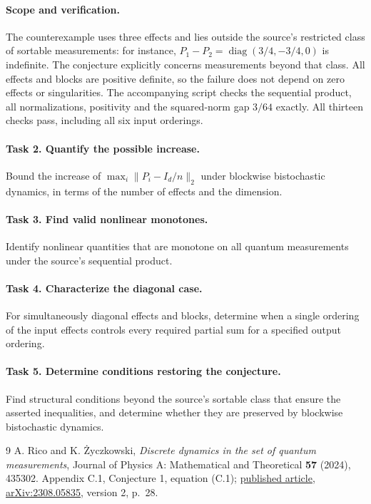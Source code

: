 \documentclass[11pt]{article}
\begin{document}
\paragraph{Scope and verification.}
The counterexample uses three effects and lies outside the source's
restricted class of sortable measurements: for instance,
$P_1-P_2=\operatorname{diag}(3/4,-3/4,0)$ is indefinite.
The conjecture explicitly concerns measurements beyond that class.
All effects and blocks are positive definite, so the failure does not
depend on zero effects or singularities.
The accompanying script checks the sequential product, all
normalizations, positivity and the squared-norm gap $3/64$ exactly.
All thirteen checks pass, including all six input orderings.

\paragraph{Task 2. Quantify the possible increase.}
Bound the increase of
$\max_i\|P_i-I_d/n\|_2$ under blockwise bistochastic dynamics, in terms
of the number of effects and the dimension.

\paragraph{Task 3. Find valid nonlinear monotones.}
Identify nonlinear quantities that are monotone on all quantum
measurements under the source's sequential product.

\paragraph{Task 4. Characterize the diagonal case.}
For simultaneously diagonal effects and blocks, determine when a
single ordering of the input effects controls every required partial
sum for a specified output ordering.

\paragraph{Task 5. Determine conditions restoring the conjecture.}
Find structural conditions beyond the source's sortable class that
ensure the asserted inequalities, and determine whether they are
preserved by blockwise bistochastic dynamics.

\begin{thebibliography}{9}
A. Rico and K. \.{Z}yczkowski,
\emph{Discrete dynamics in the set of quantum measurements},
Journal of Physics A: Mathematical and Theoretical \textbf{57} (2024),
435302. Appendix C.1, Conjecture 1, equation (C.1);
\href{https://doi.org/10.1088/1751-8121/ad7dc2}{published article},
\href{https://arxiv.org/abs/2308.05835}{arXiv:2308.05835},
version 2, p.~28.
\end{thebibliography}
\end{document}
